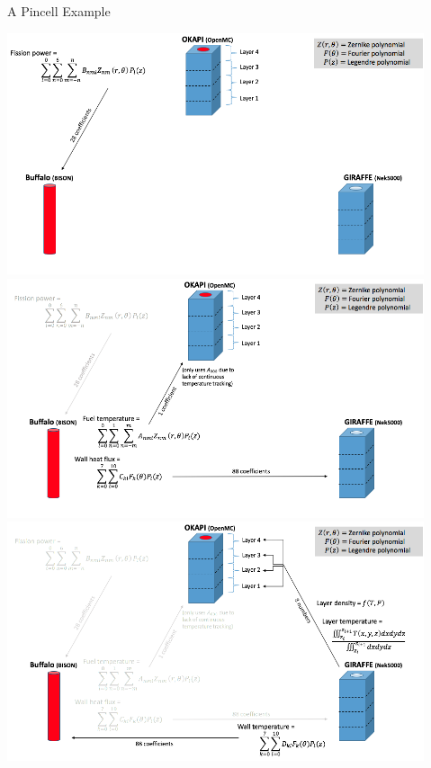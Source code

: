 \documentclass[10pt]{beamer}
\begin{document}
\begin{frame}{A Pincell Example}
\begin{overprint}
\centering\includegraphics[width=12.25cm]{../Figures/detailed_coupling_pic1.png}
\centering\includegraphics[width=12.25cm]{../Figures/detailed_coupling_pic2.png}
\centering\includegraphics[width=12.25cm]{../Figures/detailed_coupling_pic3.png}
\end{overprint}
\end{frame}
\end{document}
